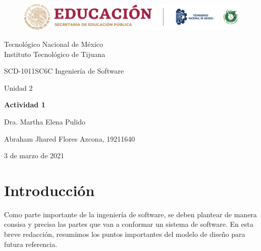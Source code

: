 \documentclass[stu, 12pt, letterpaper, donotrepeattitle, floatsintext, natbib]{apa7}
\begin{document}
    \begin{titlepage}
        \begin{figure}[ht]
            \centering
            \includegraphics[width=15cm]{logosITT.png}
        \end{figure}
        \centering
        {\Large Tecnológico Nacional de México\\Instituto Tecnológico de Tijuana\par}
        \vspace{1cm}
        {\Large SCD-1011SC6C Ingeniería de Software\par}
        \vspace{1cm}
        {\Large Unidad 2\par}
        \vspace{2cm}
        {\Large\bfseries Actividad 1\par}
        \vspace{2cm}
        {\large Dra. Martha Elena Pulido\par}
        \vfill
            {\large Abraham Jhared Flores Azcona, 19211640\par}
        \vfill
        {\large 3 de marzo de 2021}
    \end{titlepage}

\renewcommand\contentsname{Contenido}
\tableofcontents

\newpage
\section{Introducción}
Como parte importante de la ingeniería de software, se deben plantear de manera consisa y precisa las partes que van
a conformar un sistema de software. En esta breve redacción, resumimos los puntos importantes del modelo de diseño para futura referencia.
\vspace{\baselineskip}
\end{document}
